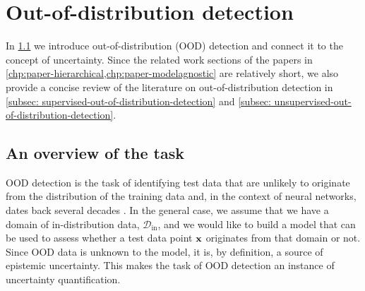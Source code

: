 \section{Out-of-distribution detection} \label{sec:out-of-distribution-detection}
% 
%
%
In \cref{subsec: overview-of-out-of-distribution-detection} we introduce out-of-distribution (OOD) detection and connect it to the concept of uncertainty. 
Since the related work sections of the papers in \cref{chp:paper-hierarchical,chp:paper-modelagnostic} are relatively short, we also provide a concise review of the literature on out-of-distribution detection in \cref{subsec: supervised-out-of-distribution-detection} and \ref{subsec: unsupervised-out-of-distribution-detection}. 


\subsection{An overview of the task}\label{subsec: overview-of-out-of-distribution-detection}
%
OOD detection is the task of identifying test data that are unlikely to originate from the distribution of the training data and, in the context of neural networks, dates back several decades \parencite{bishop_novelty_1994, chang_figure_1993}.
In the general case, we assume that we have a domain of in-distribution data, $\mathcal{D}_{\text{in}}$, and we would like to build a model that can be used to assess whether a test data point ${\mathbf{x}}$ originates from that domain or not. 
Since OOD data is unknown to the model, it is, by definition, a source of epistemic uncertainty. This makes the task of OOD detection an instance of uncertainty quantification. 


